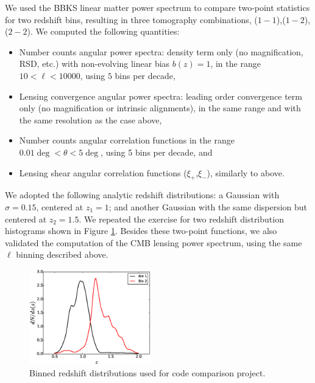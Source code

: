 \documentclass[\docopts]{\docclass}
\begin{document}
We used the BBKS linear matter power spectrum to compare two-point statistics for two redshift bins, resulting in three tomography combinations, ($1-1$),($1-2$),($2-2$). We computed the following quantities:
\begin{itemize}
\item Number counts angular power spectra: density term only (no magnification, RSD, etc.) with non-evolving linear bias $b(z) = 1$, in the range $10 < \ell < 10000$, using $5$ bins per decade,
\item Lensing convergence angular power spectra: leading order convergence term only (no magnification or intrinsic alignments), in the same range and with the same resolution as the case above,
\item Number counts angular correlation functions in the range $0.01 \deg < \theta < 5 \deg$, using 5 bins per decade, and
\item Lensing shear angular correlation functions ($\xi_+$,$\xi_-$), similarly to above.
\end{itemize}
We adopted the following analytic redshift distributions: a Gaussian with $\sigma = 0.15$, centered at $z_1 = 1$; and another Gaussian with the same dispersion but centered at $z_2 = 1.5$. We repeated the exercise for two redshift distribution histograms shown in Figure \ref{fig:zhistos}. Besides these two-point functions, we also validated the computation of the CMB lensing power spectrum, using the same $\ell$ binning described above.

\begin{figure}
\centering
\includegraphics[width=0.47\textwidth]{zdist.eps}
\caption{Binned redshift distributions used for code comparison project.}
\label{fig:zhistos}
\end{figure}
\end{document}
